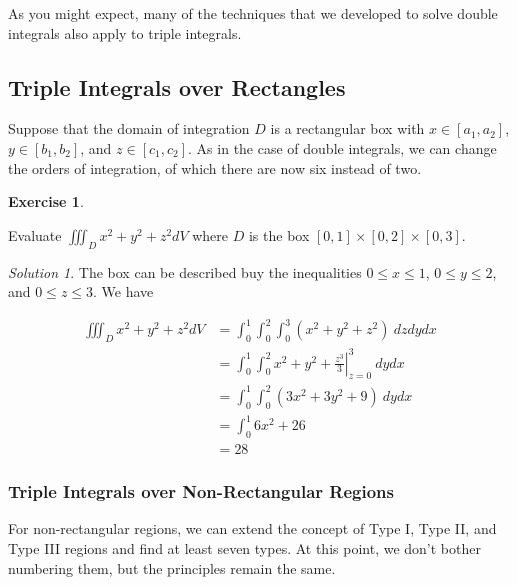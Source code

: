 \documentclass[
]{book}
\theoremstyle{definition}
\theoremstyle{definition}
\theoremstyle{definition}
\newtheorem{exercise}{Exercise}[chapter]
\theoremstyle{definition}
\theoremstyle{remark}
\newtheorem*{solution}{Solution}
\begin{document}
As you might expect, many of the techniques that we developed to solve double integrals also apply to triple integrals.

\hypertarget{triple-integrals-over-rectangles}{%
\subsection{Triple Integrals over Rectangles}\label{triple-integrals-over-rectangles}}

Suppose that the domain of integration \(D\) is a rectangular box with \(x\in[a_1,a_2]\), \(y\in[b_1,b_2]\), and \(z\in[c_1,c_2]\). As in the case of double integrals, we can change the orders of integration, of which there are now six instead of two.

\begin{exercise}
\protect\hypertarget{exr:unlabeled-div-116}{}\label{exr:unlabeled-div-116}

Evaluate \(\displaystyle \iiint_D x^2+y^2+z^2 dV\) where \(D\) is the box \([0,1]\times [0,2] \times [0,3]\).

\end{exercise}

\begin{solution}

The box can be described buy the inequalities \(0\leq x \leq 1\), \(0\leq y \leq 2\), and \(0\leq z \leq 3\). We have

\begin{align*}
\iiint_D x^2+y^2+z^2 dV &= \int_0^1 \int_0^2\int_0^3 (x^2+y^2+z^2)~dz dy dx \\
&= \int_0^1 \int_0^2 \left. x^2 +y^2 + \frac{z^3}{3}\right |_{z=0}^3 ~dy dx \\
&= \int_0^1 \int_0^2 (3x^2+3y^2+9)~ dy dx \\
&= \int_0^1 6x^2+26 \\
&= 28
\end{align*}

\end{solution}

\hypertarget{triple-integrals-over-non-rectangular-regions}{%
\subsubsection{Triple Integrals over Non-Rectangular Regions}\label{triple-integrals-over-non-rectangular-regions}}

For non-rectangular regions, we can extend the concept of Type I, Type II, and Type III regions and find at least seven types. At this point, we don't bother numbering them, but the principles remain the same.
\end{document}
